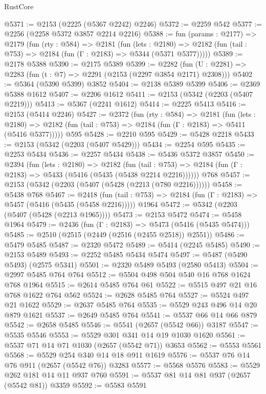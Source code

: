 \begin{lexlean}{RustCore}
\begin{coremodule}
@5371 := @2153 (@2225 (@5367 @2242) @2246)
@5372 := @2259 @542
@5377 := @2256 (@2258 @5372 @3857 @2214 @2216)
@5388 := fun (params : @2177) =>
  @2179
    (fun (rty : @584) =>
    @2181
      (fun (lets : @2180) =>
      @2182 (fun (tail : @753) => @2184 (fun (Γ : @2183) => @5344 (@5371 @5377)))))
@5389 := @2178 @5388
@5390 := @2175 @5389
@5399 := @2282 (fun (U : @2281) => @2283 (fun (t : @7) => @2291 (@2153 (@2297 @3854 @2171) @2308)))
@5402 := @5364 (@5390 @5399) @3852
@5404 := @2138 @5389 @5399
@5406 := @2369 @5388 @1612
@5407 := @2206 @1612
@5411 := @2153 (@5342 (@2203 (@5407 @2219)))
@5413 := @5367 (@2241 @1612)
@5414 := @2225 @5413
@5416 := @2153 (@5414 @2246)
@5427 := @2372
    (fun (rty : @584) =>
    @2181
      (fun (lets : @2180) =>
      @2182 (fun (tail : @753) => @2184 (fun (Γ : @2183) => @5411 (@5416 @5377)))))
    @595
@5428 := @2210 @595
@5429 := @5428 @2218
@5433 := @2153 (@5342 (@2203 (@5407 @5429)))
@5434 := @2254 @595
@5435 := @2253 @5434
@5436 := @2257 @5434
@5438 := @5436 @5372 @3857
@5450 := @2394
    (fun (lets : @2180) =>
    @2182
      (fun (tail : @753) => @2184 (fun (Γ : @2183) => @5433 (@5416 (@5435 (@5438 @2214 @2216))))))
    @768
@5457 := @2153 (@5342 (@2203 (@5407 (@5428 (@2213 (@780 @2216))))))
@5458 := @5438 @768
@5467 := @2418
    (fun (tail : @753) => @2184 (fun (Γ : @2183) => @5457 (@5416 (@5435 (@5458 @2216)))))
    @1964
@5472 := @5342 (@2203 (@5407 (@5428 (@2213 @1965))))
@5473 := @2153 @5472
@5474 := @5458 @1964
@5479 := @2436 (fun (Γ : @2183) => @5473 (@5416 (@5435 @5474)))
@5485 := @2510 (@2515 (@2449 (@2516 (@2455 @2518)) @2551))
@5486 := @5479 @5485
@5487 := @2320 @5472
@5489 := @5414 (@2245 @5485)
@5490 := @2153 @5489
@5493 := @2252 @5485 @5434 @5474
@5497 := @5487 (@5490 @5493) (@2575 @5341)
@5501 := @2320 @5489 @5493 (@2580 @5413)
@5504 := @2997 @5485 @764 @764
@5512 := @5504 @498 @504 @540 @16 @768 @1624 @768 @1964
@5515 := @2614 @5485 @764 @61
@5522 := @5515 @497 @21 @16 @768 @1622 @764 @562
@5524 := @2628 @5485 @764
@5527 := @5524 @497 @21 @1622
@5529 := @2637 @5485 @764
@5535 := @5529 @243 @496 @14 @20 @879 @1621
@5537 := @2649 @5485 @764
@5541 := @5537 @66 @14 @66 @879
@5542 := @2658 @5485
@5546 := @5541 (@2657 (@5542 @66)) @3187
@5547 := @5535 @5546
@5553 := @5529 @301 @341 @14 @19 @1030 @1620
@5561 := @5537 @71 @14 @71 @1030 (@2657 (@5542 @71)) @3653
@5562 := @5553 @5561
@5568 := @5529 @254 @340 @14 @18 @911 @1619
@5576 := @5537 @76 @14 @76 @911 (@2657 (@5542 @76)) @3283
@5577 := @5568 @5576
@5583 := @5529 @262 @181 @14 @11 @937 @760
@5591 := @5537 @81 @14 @81 @937 (@2657 (@5542 @81)) @3359
@5592 := @5583 @5591

\end{coremodule}
\end{lexlean}
